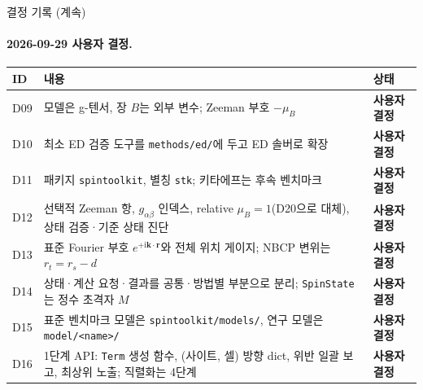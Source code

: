 \begin{frame}[label=decisions-continued]{결정 기록 (계속)}
  \framesubtitle{2026-09-29 사용자 결정.}
  \small\renewcommand{\arraystretch}{1.12}
  \begin{tabularx}{\textwidth}{@{}p{0.7cm}YP{2.5cm}@{}}
    \toprule
    ID & 내용 & 상태 \\
    \midrule
    D09 & 모델은 g-텐서, 장 $B$는 외부 변수; Zeeman 부호 $-\mu_B$ & \textbf{사용자 결정} \\
    D10 & 최소 ED 검증 도구를 \texttt{methods/ed/}에 두고 ED 솔버로 확장 & \textbf{사용자 결정} \\
    D11 & 패키지 \texttt{spintoolkit}, 별칭 \texttt{stk}; 키타에프는 후속 벤치마크 & \textbf{사용자 결정} \\
    D12 & 선택적 Zeeman 항, $g_{\alpha\beta}$ 인덱스, relative $\mu_B=1$(D20으로 대체), 상태 검증·기준 상태 진단 & \textbf{사용자 결정} \\
    D13 & 표준 Fourier 부호 $e^{+\mathrm i\mathbf k\cdot\mathbf r}$와 전체 위치 게이지; NBCP 변위는 $r_t=r_s-d$ & \textbf{사용자 결정} \\
    D14 & 상태·계산 요청·결과를 공통·방법별 부분으로 분리; \texttt{SpinState}는 정수 초격자 $M$ & \textbf{사용자 결정} \\
    D15 & 표준 벤치마크 모델은 \texttt{spintoolkit/models/}, 연구 모델은 \texttt{model/<name>/} & \textbf{사용자 결정} \\
    D16 & 1단계 API: \texttt{Term} 생성 함수, (사이트, 셀) 방향 dict, 위반 일괄 보고, 최상위 노출; 직렬화는 4단계 & \textbf{사용자 결정} \\
    \bottomrule
  \end{tabularx}
  \par\smallskip
\end{frame}

